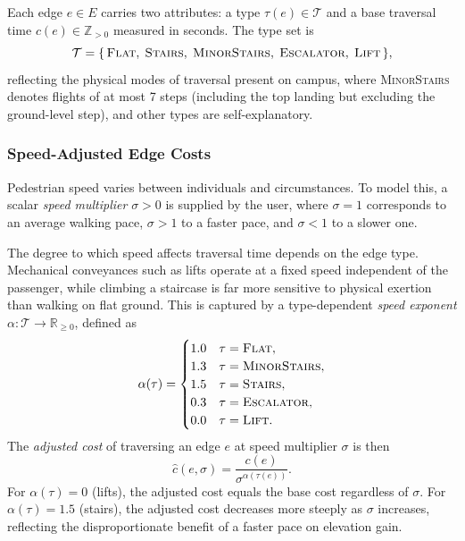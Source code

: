 \documentclass[a4paper,10pt]{amsart}
\begin{document}
Each edge $e \in E$ carries two attributes: a type $\tau(e) \in \mathcal{T}$ and a base traversal time $c(e) \in \mathbb{Z}_{>0}$ measured in seconds.
The type set is
\begin{equation}
    \mathcal{T} = \{\,\textsc{Flat},\; \textsc{Stairs},\; \textsc{MinorStairs},\; \textsc{Escalator},\; \textsc{Lift}\,\},
\end{equation}
reflecting the physical modes of traversal present on campus, where \textsc{MinorStairs} denotes flights of at most 7 steps (including the top landing but excluding the ground-level step), and other types are self-explanatory.

\subsubsection{Speed-Adjusted Edge Costs}

Pedestrian speed varies between individuals and circumstances.
To model this, a scalar \emph{speed multiplier} $\sigma > 0$ is supplied by the user, where $\sigma = 1$ corresponds to an average walking pace, $\sigma > 1$ to a faster pace, and $\sigma < 1$ to a slower one.

The degree to which speed affects traversal time depends on the edge type.
Mechanical conveyances such as lifts operate at a fixed speed independent of the passenger, while climbing a staircase is far more sensitive to physical exertion than walking on flat ground.
This is captured by a type-dependent \emph{speed exponent} $\alpha : \mathcal{T} \to \mathbb{R}_{\geq 0}$, defined as
\begin{equation} \label{eq:speed_exponent}
    \alpha(\tau) =
    \begin{cases}
        1.0 & \tau = \textsc{Flat}, \\
        1.3 & \tau = \textsc{MinorStairs}, \\
        1.5 & \tau = \textsc{Stairs}, \\
        0.3 & \tau = \textsc{Escalator}, \\
        0.0 & \tau = \textsc{Lift}.
    \end{cases}
\end{equation}
The \emph{adjusted cost} of traversing an edge $e$ at speed multiplier $\sigma$ is then
\begin{equation} \label{eq:adjusted_cost}
    \hat{c}(e,\sigma) = \frac{c(e)}{\sigma^{\alpha(\tau(e))}}.
\end{equation}
For $\alpha(\tau) = 0$ (lifts), the adjusted cost equals the base cost regardless of $\sigma$.
For $\alpha(\tau) = 1.5$ (stairs), the adjusted cost decreases more steeply as $\sigma$ increases, reflecting the disproportionate benefit of a faster pace on elevation gain.
\end{document}
